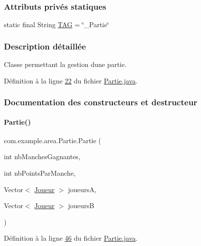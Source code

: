 \subsubsection*{Attributs privés statiques}
\begin{DoxyCompactItemize}
\item 
static final String \hyperlink{classcom_1_1example_1_1area_1_1_partie_ac0444402f7c570474df1c8b7ece88ad9}{T\+AG} = \char`\"{}\+\_\+\+Partie\char`\"{}
\end{DoxyCompactItemize}


\subsubsection{Description détaillée}
Classe permettant la gestion d\textquotesingle{}une partie. 

Définition à la ligne \hyperlink{_partie_8java_source_l00022}{22} du fichier \hyperlink{_partie_8java_source}{Partie.\+java}.



\subsubsection{Documentation des constructeurs et destructeur}
\mbox{\label{classcom_1_1example_1_1area_1_1_partie_a147e80f330c0236dbe800f5e2b4c2c84}} 
\paragraph{\texorpdfstring{Partie()}{Partie()}}
{\footnotesize\ttfamily com.\+example.\+area.\+Partie.\+Partie (\begin{DoxyParamCaption}\item[{int}]{nb\+Manches\+Gagnantes,  }\item[{int}]{nb\+Points\+Par\+Manche,  }\item[{Vector$<$ \hyperlink{classcom_1_1example_1_1area_1_1_joueur}{Joueur} $>$}]{joueursA,  }\item[{Vector$<$ \hyperlink{classcom_1_1example_1_1area_1_1_joueur}{Joueur} $>$}]{joueursB }\end{DoxyParamCaption})}



Définition à la ligne \hyperlink{_partie_8java_source_l00046}{46} du fichier \hyperlink{_partie_8java_source}{Partie.\+java}.



